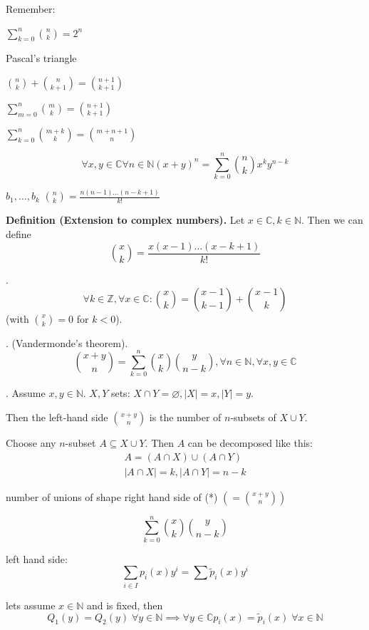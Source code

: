 Remember:
\begin{compactitem}
  \item $\sum_{k=0}^n {n\choose k} = 2^n$
  \item Pascal's triangle
  \item ${n\choose k} + {n\choose k+1} = {n+1 \choose k+1}$
  \item $\sum_{m=0}^n {m\choose k} = {n+1 \choose k+1}$
  \item $\sum_{k=0}^n {m+k \choose k} = {m+n+1 \choose n}$
\end{compactitem}

\[
  \forall x,y\in \mathbb{C}
  \forall n\in \mathbb{N}
  (x+y)^n = \sum_{k=0}^n {n\choose k} x^k y^{n-k}
\]

$b_1, \ldots, b_k$ \; ${n \choose k} = \frac{n(n-1) \ldots (n-k+1)}{k!}$

\textbf{Definition (Extension to complex numbers).}
Let $x\in \mathbb{C}, k\in\mathbb{N}$. Then we can define
\[
  {x\choose k} = \frac{
    x (x-1) \ldots (x-k+1)
  }{
    k!
  }
\]

\Lemma.
\[
  \forall k \in \mathbb{Z}, \forall x\in \mathbb{C}:
  {x\choose k} = {x-1 \choose k-1} + {x-1 \choose k}
\]
(with ${x \choose k} = 0$ for $k < 0$).

\Theorem. (Vandermonde's theorem).
\[
  {x+y \choose n} = \sum_{k=0}^{n} {x\choose k} {y\choose n-k},
  \forall n \in \mathbb{N}, \forall x,y \in \mathbb{C}
\]

\Proof.
Assume $x,y\in \mathbb{N}$. $X,Y$ sets: $X\cap Y=\varnothing, |X|=x, |Y|=y$.

Then the left-hand side
${x+y \choose n}$
is the number of $n$-subsets of $X\cup Y$.

Choose any $n$-subset $A\subseteq X\cup Y$.
Then $A$ can be decomposed like this:
\begin{gather*}
  A = (A\cap X)\cup (A\cap Y) \\
  |A\cap X| = k, |A\cap Y| = n-k
\end{gather*}

number of unions of shape right hand side of (*) $\left(={x+y \choose n} \right)$

\[
  \sum_{k=0}^n {x\choose k} {y\choose n-k}
\]

left hand side:
\[
  \sum_{i\in I} p_i (x) y^i
  = \sum \widetilde p_i (x) y^i
\]

lets assume $x\in \mathbb{N}$ and is fixed, then
\[
  Q_1(y) = Q_2(y) \; \forall y \in \mathbb{N}
  \implies \forall y\in \mathbb{C}
  p_i(x) = \widetilde p_i(x) \; \forall x \in \mathbb{N}
\]

